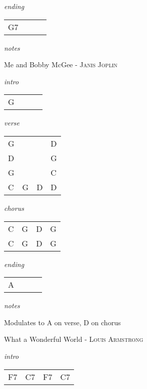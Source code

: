 \documentclass[12pt]{article}
\begin{document}
\textit{ending}

\begin{tabular}{|P{1.25in}|P{1.25in}|P{1.25in}|P{1.25in}|}
  G7 &   &   &   \\
\end{tabular}

\textit{notes}

\newpage

{\Huge Me and Bobby McGee} {\huge - \textsc{Janis Joplin}}

\huge
\textit{intro}

\begin{tabular}{|P{1.25in}|P{1.25in}|P{1.25in}|P{1.25in}|}
  G &   &   &   \\
\end{tabular}

\textit{verse}

\begin{tabular}{|P{1.25in}|P{1.25in}|P{1.25in}|P{1.25in}|}
  G &   &   &  D \\
  D &   &   &  G \\
  G &   &   &  C \\
  C & G & D &  D \\ 
\end{tabular}

\textit{chorus}

\begin{tabular}{|P{1.25in}|P{1.25in}|P{1.25in}|P{1.25in}|}
  C & G  & D  &  G \\
  C & G  & D  &  G
\end{tabular}

\textit{ending}

\begin{tabular}{|P{1.25in}|P{1.25in}|P{1.25in}|P{1.25in}|}
  A &   &   &   \\
\end{tabular}

\textit{notes}

Modulates to A on verse, D on chorus

\newpage

{\Huge What a Wonderful World} {\huge - \textsc{Louis Armstrong}}

\huge
\textit{intro}

\begin{tabular}{|P{1.25in}|P{1.25in}|P{1.25in}|P{1.25in}|}
  F7 & C7  & F7  &  C7 \\
\end{tabular}
\end{document}
